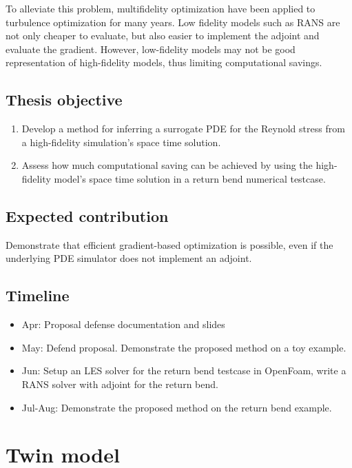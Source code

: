 \documentclass[a4paper,onecolumn]{article}
\theoremstyle{remark}
\begin{document}
\noindent To alleviate this problem, multifidelity optimization have been applied to turbulence optimization for many years. Low fidelity models such as RANS are not only cheaper to evaluate, but also easier to implement the adjoint and evaluate the gradient. However, low-fidelity models may not be good representation of high-fidelity models, thus limiting computational savings.\\

\subsection{Thesis objective}
\begin{enumerate}
    \item Develop a method for inferring a surrogate PDE for the Reynold stress from a 
    high-fidelity simulation's space time solution.
    \item Assess how much computational saving can be achieved by using the high-fidelity model's space time solution in  a return bend numerical testcase.
\end{enumerate}

\subsection{Expected contribution}
\noindent Demonstrate that efficient gradient-based optimization is possible, even if the underlying PDE simulator does not implement an adjoint.\\


\subsection{Timeline}
\begin{itemize}
    \item Apr: Proposal defense documentation and slides
    \item May: Defend proposal. Demonstrate the proposed method on a toy example.
    \item Jun: Setup an LES solver for the return bend testcase in OpenFoam, write a RANS solver with adjoint for the return bend.
    \item Jul-Aug: Demonstrate the proposed method on the return bend example.
\end{itemize}

\newpage
\section{Twin model}
\label{gradient_surrogate}
\end{document}
